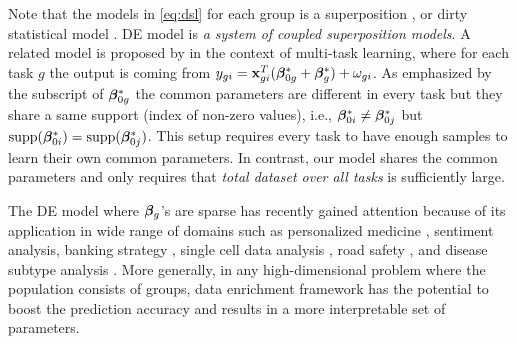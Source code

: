 Note that the models in \eqref{eq:dsl} for each group is a superposition \cite{guba16, mctr13}, or dirty statistical model \cite{yara13}. %
DE model is \emph{a system of coupled superposition models}.
A related model is proposed by \cite{jrsr10} in the context of multi-task learning, where for each task $g$ the output is coming from $y_{gi} = \mathbf{x}_{gi}^T (\boldsymbol{\beta}_{0g}^* + \boldsymbol{\beta}^*_g) + \omega_{gi}$.
As emphasized by the subscript of $\boldsymbol{\beta}_{0g}^*$ the common parameters are different in every task but they share a same support (index of non-zero values), i.e., $\boldsymbol{\beta}_{0i}^* \neq \boldsymbol{\beta}_{0j}^*$ but $\text{supp}(\boldsymbol{\beta}_{0i}^*) = \text{supp}(\boldsymbol{\beta}_{0j}^*)$. 
This setup requires every task to have enough samples to learn their own common parameters. In contrast, our model shares the common parameters and only requires that {\em{total dataset over all tasks}} is sufficiently large.


The DE model where $\boldsymbol{\beta}_g$'s are sparse has recently gained attention because of its application in wide range of domains such as personalized medicine \cite{domu16}, sentiment analysis, banking strategy \cite{grti16}, single cell data analysis \cite{olvi15}, road safety \cite{olvi14}, and disease subtype analysis \cite{domu16}.
More generally, in any high-dimensional problem where the population consists of groups, data enrichment framework has the potential to boost the prediction accuracy and results in a more interpretable set of parameters.

